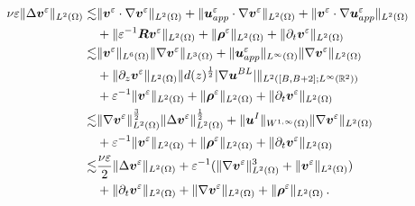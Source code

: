 \documentclass[pdflatex,sn-mathphys-num]{sn-jnl}%
\theoremstyle{thmstyleone}%
\theoremstyle{thmstyletwo}%
\theoremstyle{thmstylethree}%
\theoremstyle{thmstyletwo}
\begin{document}
\begin{align}\label{3.3.4}
	\nu\varepsilon
	\lVert\Delta{\boldsymbol v}^{\varepsilon}\rVert_{{L}^{2}(\Omega)}
	\lesssim&
	\lVert
	{\boldsymbol v}^{\varepsilon} \cdot \nabla {\boldsymbol v}^{\varepsilon}
	\rVert_{{L}^{2}(\Omega)}
	+\lVert
	{\boldsymbol u}_{app}^{\varepsilon} \cdot \nabla {\boldsymbol v}^{\varepsilon}
	\rVert_{{L}^{2}(\Omega)}
	+\lVert
	{\boldsymbol v}^{\varepsilon} \cdot \nabla\boldsymbol{u}^\varepsilon_{app}
	\rVert_{{L}^{2}(\Omega)}\notag\\
	&+
	\lVert{\varepsilon}^{-1}\boldsymbol{R}\boldsymbol v^{\varepsilon}
	\rVert_{{L}^{2}(\Omega)}
	+\lVert\boldsymbol \rho^{\varepsilon}
	\rVert_{{L}^{2}(\Omega)}
	+\lVert
	\partial_{t} {\boldsymbol v}^{\varepsilon}
	\rVert_{{L}^{2}(\Omega)}
	\notag\\
	\lesssim&
	\lVert
	{\boldsymbol v}^{\varepsilon}
	\rVert_{{L}^{6}(\Omega)}
	\lVert\nabla {\boldsymbol v}^{\varepsilon}
	\rVert_{{L}^{3}(\Omega)}
	+\lVert
	{\boldsymbol u}_{app}^{\varepsilon}
	\rVert_{{L}^{\infty}(\Omega)} 
	\lVert \nabla {\boldsymbol v}^{\varepsilon}
	\rVert_{{L}^{2}(\Omega)}\notag\\
	&
	+\lVert
	\partial_z{\boldsymbol v}^{\varepsilon}
	\rVert_{{L}^{2}(\Omega)}
	\lVert d(z)^{\frac{1}{2}} |\nabla\boldsymbol{u}^{BL}| \rVert_{{L}^2([B,B+2];{L}^\infty(\mathbb{R}^2))}\notag\\
	&+
	{\varepsilon}^{-1}\lVert\boldsymbol v^{\varepsilon}
	\rVert_{{L}^{2}(\Omega)}
	+\lVert\boldsymbol \rho^{\varepsilon}
	\rVert_{{L}^{2}(\Omega)}
	+\lVert
	\partial_{t} {\boldsymbol v}^{\varepsilon}
	\rVert_{{L}^{2}(\Omega)}
	\notag\\
	\lesssim&
	\lVert
	\nabla{\boldsymbol v}^{\varepsilon}
	\rVert^{\frac32}_{{L}^{2}(\Omega)}
	\lVert\Delta {\boldsymbol v}^{\varepsilon}
	\rVert^{\frac12}_{{L}^{2}(\Omega)}
	+\lVert
	{\boldsymbol u}^{I}
	\rVert_{{W}^{1,\infty}(\Omega)} 
	\lVert \nabla {\boldsymbol v}^{\varepsilon}
	\rVert_{{L}^{2}(\Omega)}\notag\\
	&+
	{\varepsilon}^{-1}\lVert\boldsymbol v^{\varepsilon}
	\rVert_{{L}^{2}(\Omega)}
	+\lVert\boldsymbol \rho^{\varepsilon}
	\rVert_{{L}^{2}(\Omega)}
	+\lVert
	\partial_{t} {\boldsymbol v}^{\varepsilon}
	\rVert_{{L}^{2}(\Omega)}\notag\\
	\lesssim&
	\frac{\nu\varepsilon}{2}
	\lVert\Delta {\boldsymbol v}^{\varepsilon}
	\rVert_{{L}^{2}(\Omega)}
	+
	\varepsilon^{-1}(\lVert
	\nabla{\boldsymbol v}^{\varepsilon}
	\rVert^{3}_{{L}^{2}(\Omega)}
	+\lVert
	{\boldsymbol v}^{\varepsilon}
	\rVert_{{L}^{2}(\Omega)})\notag\\
	&
	+\lVert
	\partial_{t} {\boldsymbol v}^{\varepsilon}
	\rVert_{{L}^{2}(\Omega)}
	+\lVert
	\nabla{\boldsymbol v}^{\varepsilon}
	\rVert_{{L}^{2}(\Omega)}+\lVert\boldsymbol \rho^{\varepsilon}
	\rVert_{{L}^{2}(\Omega)}\,.
\end{align}
\end{document}
